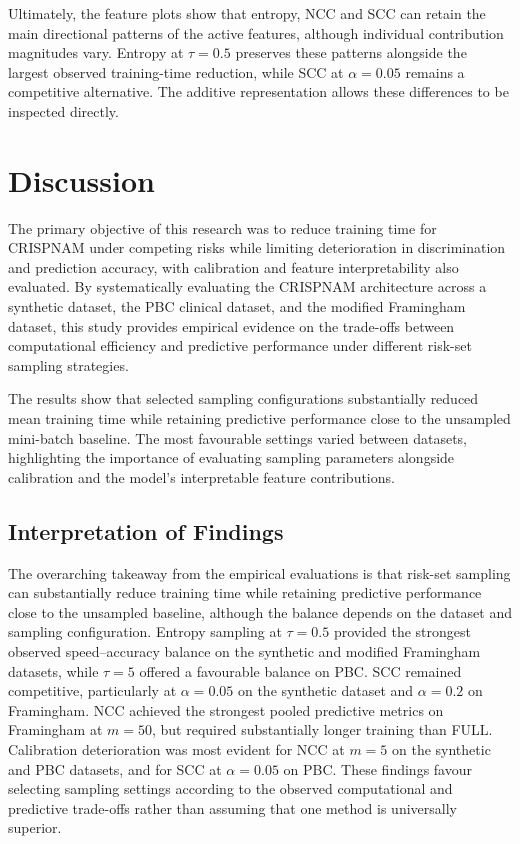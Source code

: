 \documentclass[a4paper,twoside,12pt]{report}
\begin{document}
Ultimately, the feature plots show that entropy, NCC and SCC can retain the main directional patterns of the active features, although individual contribution magnitudes vary. Entropy at $\tau=0.5$ preserves these patterns alongside the largest observed training-time reduction, while SCC at $\alpha=0.05$ remains a competitive alternative. The additive representation allows these differences to be inspected directly.


\section{Discussion}

The primary objective of this research was to reduce training time for CRISPNAM under competing risks while limiting deterioration in discrimination and prediction accuracy, with calibration and feature interpretability also evaluated. By systematically evaluating the CRISPNAM architecture across a synthetic dataset, the PBC clinical dataset, and the modified Framingham dataset, this study provides empirical evidence on the trade-offs between computational efficiency and predictive performance under different risk-set sampling strategies.

The results show that selected sampling configurations substantially reduced mean training time while retaining predictive performance close to the unsampled mini-batch baseline. The most favourable settings varied between datasets, highlighting the importance of evaluating sampling parameters alongside calibration and the model's interpretable feature contributions.

\subsection{Interpretation of Findings}

The overarching takeaway from the empirical evaluations is that risk-set sampling can substantially reduce training time while retaining predictive performance close to the unsampled baseline, although the balance depends on the dataset and sampling configuration. Entropy sampling at $\tau=0.5$ provided the strongest observed speed--accuracy balance on the synthetic and modified Framingham datasets, while $\tau=5$ offered a favourable balance on PBC. SCC remained competitive, particularly at $\alpha=0.05$ on the synthetic dataset and $\alpha=0.2$ on Framingham. NCC achieved the strongest pooled predictive metrics on Framingham at $m=50$, but required substantially longer training than FULL. Calibration deterioration was most evident for NCC at $m=5$ on the synthetic and PBC datasets, and for SCC at $\alpha=0.05$ on PBC. These findings favour selecting sampling settings according to the observed computational and predictive trade-offs rather than assuming that one method is universally superior.
\end{document}

